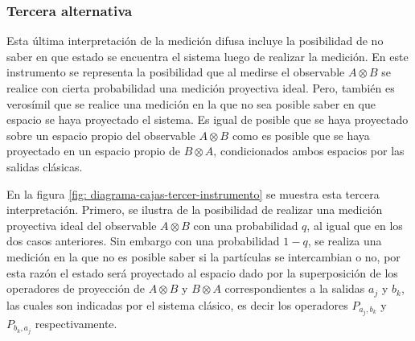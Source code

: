 \subsubsection{Tercera alternativa} %
    Esta última interpretación de la medición difusa incluye la posibilidad de no saber en que estado se encuentra el sistema luego de realizar la medición. En este instrumento se representa la posibilidad que al medirse el observable $A\otimes B$ se realice con cierta probabilidad una medición proyectiva ideal. Pero, también es verosímil que se realice una medición en la que no sea posible saber en que espacio se haya proyectado el sistema. Es igual de posible que se haya proyectado sobre un espacio propio del observable $A\otimes B$ como es posible que se haya proyectado en un espacio propio de $B\otimes A$,  condicionados ambos espacios por las salidas clásicas. 

    En la figura {\ref{fig: diagrama-cajas-tercer-instrumento}} se muestra esta tercera interpretación. Primero, se ilustra de la posibilidad de realizar una medición proyectiva ideal del observable $A\otimes B$ con una probabilidad $q$, al igual que en los dos casos anteriores. Sin embargo con una probabilidad $1-q$, se realiza una medición en la que no es posible saber si la partículas se intercambian o no, por esta razón el estado será proyectado al espacio dado por la superposición de los operadores de proyección de $A\otimes B$ y $B\otimes A$ correspondientes a la salidas $a_j$ y $ b_k$, las cuales son indicadas por el sistema clásico, es decir los operadores  $P_{a_j,b_k}$ y $P_{b_k,a_j}$ respectivamente. 




